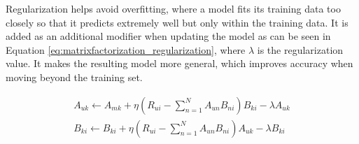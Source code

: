 Regularization helps avoid overfitting, where a model fits its training data too closely so that it predicts extremely well but only within the training data. It is added as an additional modifier when updating the model as can be seen in Equation \ref{eq:matrixfactorization_regularization}, where $\lambda$ is the regularization value. It makes the resulting model more general, which improves accuracy when moving beyond the training set.

\begin{equation}\label{eq:matrixfactorization_regularization}
	\begin{split}
	A_{uk}\leftarrow A_{mk} + \eta(R_{ui}-\sum_{n=1}^{N}A_{un}B_{ni})B_{ki}-\lambda A_{uk}
	\\
	B_{ki}\leftarrow B_{ki} + \eta(R_{ui}-\sum_{n=1}^{N}A_{un}B_{ni})A_{uk} -\lambda B_{ki}
	\end{split}
\end{equation}

